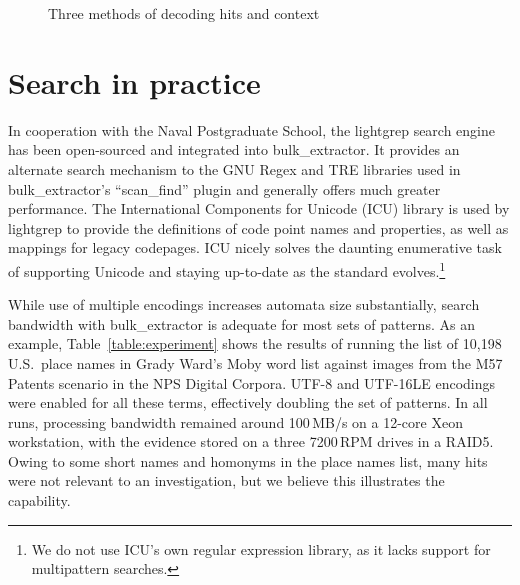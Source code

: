 \documentclass[5p,final,number,sort&compress]{elsarticle}
\begin{document}
\begin{figure}[ht]
{
}
\caption{Three methods of decoding hits and context\label{fig:decode}}
\end{figure}

\section{Search in practice}

In cooperation with the Naval Postgraduate School, the lightgrep search engine has been open-sourced and integrated into bulk\_extractor. It provides an alternate search mechanism to the GNU Regex and TRE libraries used in bulk\_extractor's ``scan\_find'' plugin and generally offers much greater performance. The International Components for Unicode (ICU) library is used by lightgrep to provide the definitions of code point names and properties, as well as mappings for legacy codepages. ICU nicely solves the daunting enumerative task of supporting Unicode and staying up-to-date as the standard evolves.\footnote{We do not use ICU's own regular expression library, as it lacks support for multipattern searches.}

While use of multiple encodings increases automata size substantially, search bandwidth with bulk\_extractor is adequate for most sets of patterns. As an example, Table~\ref{table:experiment} shows the results of running the list of 10,198 U.S.\ place names in Grady Ward's Moby word list against images from the M57 Patents scenario in the NPS Digital Corpora. UTF-8 and UTF-16LE encodings were enabled for all these terms, effectively doubling the set of patterns. In all runs, processing bandwidth remained around 100\,MB/s on a 12-core Xeon workstation, with the evidence stored on a three 7200\,RPM drives in a RAID5. Owing to some short names and homonyms in the place names list, many hits were not relevant to an investigation, but we believe this illustrates the capability.
\end{document}
